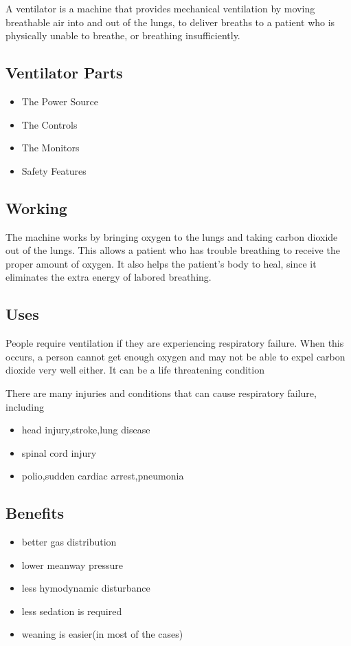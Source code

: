\documentclass[12pt]{article}
\begin{document}
 A ventilator is a machine that provides mechanical ventilation by moving breathable air into and out of the lungs, to deliver breaths to a patient who is physically unable to breathe, or breathing insufficiently.
 \subsection{Ventilator Parts} 
 \begin{itemize}
 \item The Power Source
 \item The Controls
 \item The Monitors
 \item Safety Features

 \end{itemize}
 
 \subsection{Working}
 The machine works by bringing oxygen to the lungs and taking carbon dioxide out of the lungs. This allows a patient who has trouble breathing to receive the proper amount of oxygen. It also helps the patient's body to heal, since it eliminates the extra energy of labored breathing.
 
 \subsection{Uses}
 People require ventilation if they are experiencing respiratory failure. When this occurs, a person cannot get enough oxygen and may not be able to expel carbon dioxide very well either. It can be a life threatening condition

 There are many injuries and conditions that can cause respiratory failure, including
 \begin{itemize}
 \item head injury,stroke,lung disease
\item spinal cord injury
\item polio,sudden cardiac arrest,pneumonia
\end{itemize}

\subsection{Benefits}

\begin{itemize}

\item better gas distribution
\item lower meanway pressure
\item less hymodynamic disturbance
\item less sedation is required
\item weaning is easier(in most of the cases)


 \end{itemize}
\end{document}
